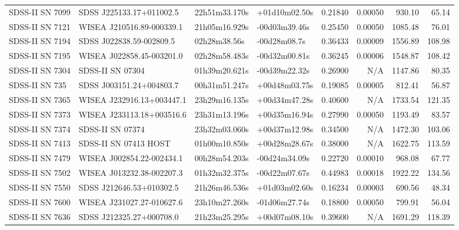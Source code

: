 \begin{longtable}{llllrrrr}
SDSS-II SN 7099  &        SDSS J225133.17+011002.5 &   22h51m33.170s &   +01d10m02.50s &  0.21840 &  0.00050 &   930.10 &       65.14 \\
SDSS-II SN 7121  &       WISEA J210516.89-000339.1 &   21h05m16.929s &   -00d03m39.46s &  0.25450 &  0.00050 &  1085.48 &       76.01 \\
SDSS-II SN 7194  &        SDSS J022838.59-002809.5 &    02h28m38.56s &    -00d28m08.7s &  0.36433 &  0.00009 &  1556.89 &      108.98 \\
SDSS-II SN 7195  &       WISEA J022858.45-003201.0 &   02h28m58.483s &   -00d32m00.81s &  0.36245 &  0.00006 &  1548.87 &      108.42 \\
SDSS-II SN 7304  &                SDSS-II SN 07304 &   01h39m20.621s &   -00d39m22.32s &  0.26900 &      N/A &  1147.86 &       80.35 \\
SDSS-II SN 735   &        SDSS J003151.24+004803.7 &   00h31m51.247s &   +00d48m03.75s &  0.19085 &  0.00005 &   812.41 &       56.87 \\
SDSS-II SN 7365  &       WISEA J232916.13+003447.1 &   23h29m16.135s &   +00d34m47.28s &  0.40600 &      N/A &  1733.54 &      121.35 \\
SDSS-II SN 7373  &       WISEA J233113.18+003516.6 &   23h31m13.196s &   +00d35m16.94s &  0.27990 &  0.00050 &  1193.49 &       83.57 \\
SDSS-II SN 7374  &                SDSS-II SN 07374 &   23h32m03.060s &   +00d37m12.98s &  0.34500 &      N/A &  1472.30 &      103.06 \\
SDSS-II SN 7413  &           SDSS-II SN 07413 HOST &   01h00m10.850s &   +00d28m28.67s &  0.38000 &      N/A &  1622.75 &      113.59 \\
SDSS-II SN 7479  &       WISEA J002854.22-002434.1 &   00h28m54.203s &   -00d24m34.09s &  0.22720 &  0.00010 &   968.08 &       67.77 \\
SDSS-II SN 7502  &       WISEA J013232.38-002207.3 &   01h32m32.375s &   -00d22m07.67s &  0.44983 &  0.00018 &  1922.22 &      134.56 \\
SDSS-II SN 7550  &        SDSS J212646.53+010302.5 &   21h26m46.536s &   +01d03m02.60s &  0.16234 &  0.00003 &   690.56 &       48.34 \\
SDSS-II SN 7600  &       WISEA J231027.27-010627.6 &   23h10m27.260s &   -01d06m27.74s &  0.18800 &  0.00050 &   799.91 &       56.04 \\
SDSS-II SN 7636  &        SDSS J212325.27+000708.0 &   21h23m25.295s &   +00d07m08.10s &  0.39600 &      N/A &  1691.29 &      118.39 \\

\end{longtable}
